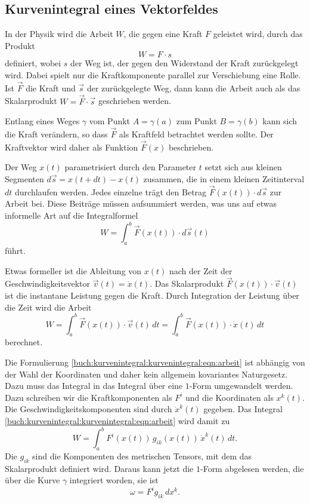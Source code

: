 %
%
\subsection{Kurvenintegral eines Vektorfeldes
\label{buch:kurvenintegral:subsection:kurvenintegralvektorfeld}}
In der Physik wird die Arbeit $W$, die gegen eine Kraft $F$ geleistet wird,
durch das Produkt
\[
W = F\cdot s
\]
definiert, wobei $s$ der Weg ist, der gegen den Widerstand der Kraft
zurückgelegt wird.
Dabei spielt nur die Kraftkomponente parallel zur Verschiebung eine Rolle.
Ist $\vec{F}$ die Kraft und $\vec{s}$ der zurückgelegte Weg, dann kann 
die Arbeit auch als das Skalarprodukt $W=\vec{F}\cdot\vec{s}$ geschrieben
werden.

Entlang eines Weges $\gamma$ vom Punkt $A=\gamma(a)$ zum Punkt
$B=\gamma(b)$ kann sich die Kraft verändern, so dass $\vec{F}$
als Kraftfeld betrachtet werden sollte.
Der Kraftvektor wird daher als Funktion $\vec{F}(x)$ beschrieben.

Der Weg $x(t)$ parametrisiert durch den Parameter $t$ setzt sich aus
kleinen Segmenten $d\vec{s} = x(t+dt)-x(t)$ zusammen, die in einem
kleinen Zeitinterval $dt$ durchlaufen werden.
Jedes einzelne trägt den Betrag $\vec{F}(x(t))\cdot d\vec{s}$ zur
Arbeit bei.
Diese Beiträge müssen aufsummiert werden, was uns auf etwas informelle
Art auf die Integralformel
\[
W
=
\int_a^b \vec{F}(x(t))\cdot d\vec{s}(t)
\]
führt.

Etwas formeller ist die Ableitung von $x(t)$ nach der Zeit
der Geschwindigkeitsvektor $\vec{v}(t)=\dot{x}(t)$.
Das Skalarprodukt $\vec{F}(x(t))\cdot \vec{v}(t)$ ist die
instantane Leistung gegen die Kraft.
Durch Integration der Leistung über die Zeit wird die Arbeit
\begin{equation}
W
=
\int_a^b \vec{F}(x(t))\cdot \vec{v}(t)\,dt
=
\int_a^b \vec{F}(x(t))\cdot \dot{x}(t)\,dt
\label{buch:kurvenintegral:kurvenintegral:eqn:arbeit}
\end{equation}
berechnet.

Die Formulierung \eqref{buch:kurvenintegral:kurvenintegral:eqn:arbeit}
ist abhängig von der Wahl der Koordinaten und daher kein allgemein 
kovariantes Naturgesetz.
Dazu muss das Integral in das Integral über eine $1$-Form umgewandelt
werden.
Dazu schreiben wir die Kraftkomponenten als $F^i$ und die Koordinaten
als $x^k(t)$.
Die Geschwindigkeitskomponenten sind durch $\dot{x}^k(t)$ gegeben.
Das Integral \eqref{buch:kurvenintegral:kurvenintegral:eqn:arbeit}
wird damit zu
\[
W
=
\int_a^b F^i(x(t))\,g_{ik}(x(t))\, \dot{x}^k(t)\,dt.
\]
Die $g_{ik}$ sind die Komponenten des metrischen Tensors, mit dem
das Skalarprodukt definiert wird.
Daraus kann jetzt die $1$-Form abgelesen werden, die über die
Kurve $\gamma$ integriert worden, sie ist
\[
\omega
=
F^ig_{ik}\,dx^k.
\]

